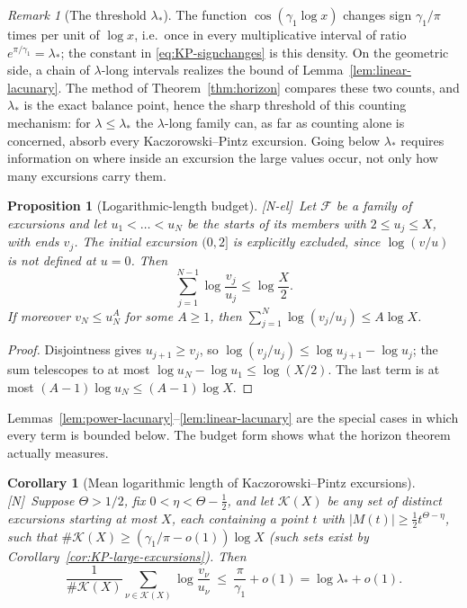\documentclass[11pt]{amsart}
\numberwithin{equation}{section}
\theoremstyle{plain}
\newtheorem{proposition}[theorem]{Proposition}
\newtheorem{corollary}[theorem]{Corollary}
\theoremstyle{definition}
\theoremstyle{remark}
\newtheorem{remark}[theorem]{Remark}
\newcommand{\F}{\mathcal{F}}
\newcommand{\tagN}{\textup{[N]}}
\newcommand{\tagNE}{\textup{[N-el]}}
\begin{document}
\begin{remark}[The threshold $\lambda_*$]
\label{rem:lambda-star}
The function $\cos(\gamma_1\log x)$ changes sign $\gamma_1/\pi$ times per
unit of $\log x$, i.e.\ once in every multiplicative interval of ratio
$e^{\pi/\gamma_1}=\lambda_*$; the constant in \eqref{eq:KP-signchanges} is
this density. On the geometric side, a chain of $\lambda$-long intervals
realizes the bound of Lemma~\ref{lem:linear-lacunary}. The method of
Theorem~\ref{thm:horizon} compares these two counts, and $\lambda_*$ is the
exact balance point, hence the sharp threshold of this counting mechanism:
for $\lambda\le\lambda_*$ the $\lambda$-long
family can, as far as counting alone is concerned, absorb every
Kaczorowski--Pintz excursion. Going below $\lambda_*$ requires information
on where inside an excursion the large values occur, not only how many
excursions carry them.
\end{remark}

\begin{proposition}[Logarithmic-length budget]
\label{prop:log-budget}
\tagNE\ Let $\F$ be a family of excursions and let $u_1<\dots<u_N$ be the starts of
its members with $2\le u_j\le X$, with ends $v_j$.  The initial excursion
$(0,2]$ is explicitly excluded, since $\log(v/u)$ is not defined at
$u=0$.  Then
\[
\sum_{j=1}^{N-1}\log\frac{v_j}{u_j}\le\log\frac X2 .
\]
If moreover $v_N\le u_N^A$ for some $A\ge1$, then
$\sum_{j=1}^{N}\log(v_j/u_j)\le A\log X$.
\end{proposition}

\begin{proof}
Disjointness gives $u_{j+1}\ge v_j$, so
$\log(v_j/u_j)\le\log u_{j+1}-\log u_j$; the sum telescopes to at most
$\log u_N-\log u_1\le\log(X/2)$. The last term is at most
$(A-1)\log u_N\le(A-1)\log X$.
\end{proof}

Lemmas~\ref{lem:power-lacunary}--\ref{lem:linear-lacunary} are the special
cases in which every term is bounded below. The budget form shows what the
horizon theorem actually measures.

\begin{corollary}[Mean logarithmic length of Kaczorowski--Pintz excursions]
\label{cor:KP-mean-log-length}
\tagN\ Suppose $\Theta>1/2$, fix $0<\eta<\Theta-\frac12$, and let $\mathcal K(X)$
be any set of distinct excursions starting at most $X$, each containing a
point $t$ with $|M(t)|\ge\frac12t^{\Theta-\eta}$, such that
$\#\mathcal K(X)\ge(\gamma_1/\pi-o(1))\log X$ (such sets exist by
Corollary~\ref{cor:KP-large-excursions}). Then
\[
\frac1{\#\mathcal K(X)}\sum_{\nu\in\mathcal K(X)}\log\frac{v_\nu}{u_\nu}
\ \le\ \frac{\pi}{\gamma_1}+o(1)=\log\lambda_*+o(1).
\]
\end{corollary}
\end{document}
